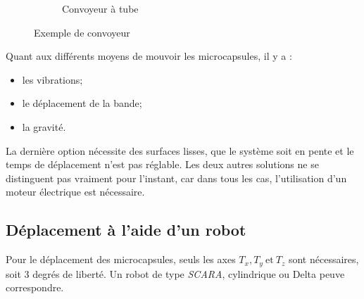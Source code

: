 \begin{figure}[ht]
\begin{subfigure}{0.45\textwidth}
        \caption{Convoyeur à tube\footnotemark}
        \label{img:convoyeur_tube}
    \end{subfigure}
    \caption{Exemple de convoyeur}
\end{figure}
Quant aux différents moyens de mouvoir les \glspl{microcapsule}, il y a : 
\begin{itemize}
    \item les vibrations;
    \item le déplacement de la bande;
    \item la gravité.
\end{itemize}

La dernière option nécessite des surfaces lisses, que le système soit en pente et le temps de déplacement n'est pas réglable. Les deux autres solutions ne se distinguent pas vraiment pour l'instant, car dans tous les cas, l'utilisation d'un moteur électrique est nécessaire.

\subsection*{Déplacement à l'aide d'un robot}
Pour le déplacement des \glspl{microcapsule}, seuls les axes $T_x, T_y~\text{et}~T_z$ sont nécessaires, soit $3$ degrés de liberté. Un robot de type \textit{SCARA}, cylindrique ou Delta peuve correspondre.

